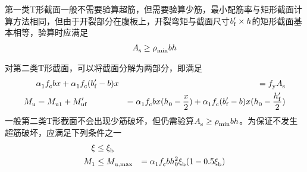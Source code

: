 \documentclass{article}
\begin{document}
第一类T形截面一般不需要验算超筋，但需要验算少筋，最小配筋率与矩形截面计算方法相同，但由于开裂部分在腹板上，开裂弯矩与截面尺寸$\script{b}[\prime]{f}\times{}h$的矩形截面基本相等，验算时应满足
\begin{align*}
      \script{A}{s} \ge \script{\rho}{min}bh
\end{align*}
\par 对第二类T形截面，可以将截面分解为两部分，即满足
\begin{align*}
                    & \script{\alpha}{1}\script{f}{c}bx + \script{\alpha}{1}\script{f}{c}(\script{b}[\prime]{f}-b)x & = \script{f}{y}\script{A}{s}                                                                                                                                            \\
      \script{M}{u} & = \script{M}{u1}+\script{M}[\prime]{uf}                                                       & = \script{\alpha}{1}\script{f}{c}bx(\script{h}{0}-\frac{x}{2})+\script{\alpha}{1}\script{f}{c}(\script{b}[\prime]{f}-b)x(\script{h}{0}-\frac{\script{h}[\prime]{f}}{2})
\end{align*}
一般第二类T形截面不会出现少筋破坏，但仍需验算$\script{A}{s}\ge{}\script{\rho}{min}bh$。为保证不发生超筋破坏，应满足下列条件之一
\begin{align*}
      \xi           & \le \script{\xi}{b}                                                                                             \\
      \script{M}{1} & \le \script{M}{u,max} & = \script{\alpha}{1}\script{f}{c}b\script{h}[2]{0}\script{\xi}{b}(1-0.5\script{\xi}{b})
\end{align*}
\end{document}

